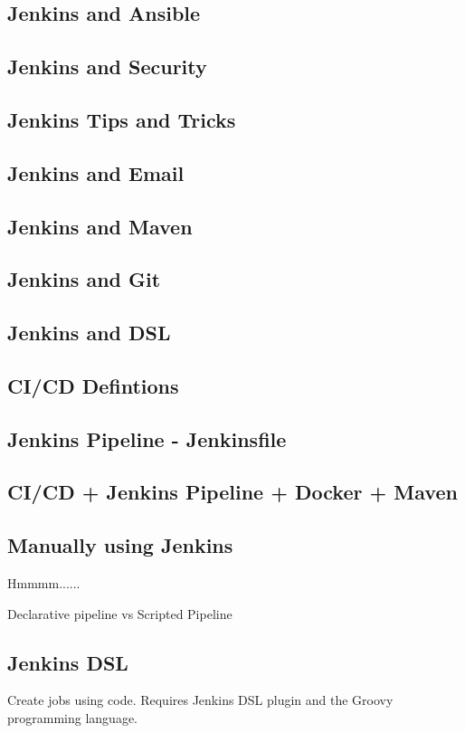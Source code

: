 \documentclass[a4paper, 11pt]{book}
\begin{document}
    \subsection{Jenkins and Ansible}
    \subsection{Jenkins and Security}
    \subsection{Jenkins Tips and Tricks}
    \subsection{Jenkins and Email}
    \subsection{Jenkins and Maven}
    \subsection{Jenkins and Git}
    \subsection{Jenkins and DSL}
    \subsection{CI/CD Defintions}
    \subsection{Jenkins Pipeline - Jenkinsfile}
    \subsection{CI/CD + Jenkins Pipeline + Docker + Maven}

    \subsection{Manually using Jenkins}
    Hmmmm......

    Declarative pipeline vs Scripted Pipeline

    \subsection{Jenkins DSL}
    Create jobs using code.
    Requires Jenkins DSL plugin and the Groovy programming language.
\end{document}
